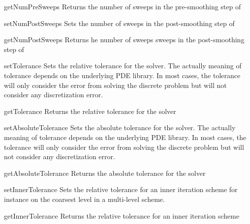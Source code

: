 \begin{methoddesc}[SolverOptions]{getNumPreSweeps}{}
Returns the number of sweeps in the pre-smoothing step of \AMG
\end{methoddesc}

\begin{methoddesc}[SolverOptions]{setNumPostSweeps}{}
Sets the number of sweeps in the post-smoothing step of \AMG
\end{methoddesc}

\begin{methoddesc}[SolverOptions]{getNumPostSweeps}{}
Returns he number of sweeps sweeps in the post-smoothing step of \AMG
\end{methoddesc}

\begin{methoddesc}[SolverOptions]{setTolerance}{}
Sets the relative tolerance for the solver. The actually meaning of tolerance depends 
on the underlying PDE library. In most cases, the tolerance
will only consider the error from solving the discrete problem but will
not consider any discretization error.
\end{methoddesc}

\begin{methoddesc}[SolverOptions]{getTolerance}{}
Returns the relative tolerance for the solver
\end{methoddesc}

\begin{methoddesc}[SolverOptions]{setAbsoluteTolerance}{}
Sets the absolute tolerance for the solver. The actually meaning of tolerance depends 
on the underlying PDE library. In most cases, the tolerance
will only consider the error from solving the discrete problem but will
not consider any discretization error.
\end{methoddesc}

\begin{methoddesc}[SolverOptions]{getAbsoluteTolerance}{}
Returns the absolute tolerance for the solver
\end{methoddesc}


\begin{methoddesc}[SolverOptions]{setInnerTolerance}{}
Sets the relative tolerance for an inner iteration scheme for instance
on the coarsest level in a multi-level scheme.
\end{methoddesc}

\begin{methoddesc}[SolverOptions]{getInnerTolerance}{}
Returns the relative tolerance for an inner iteration scheme
\end{methoddesc}

